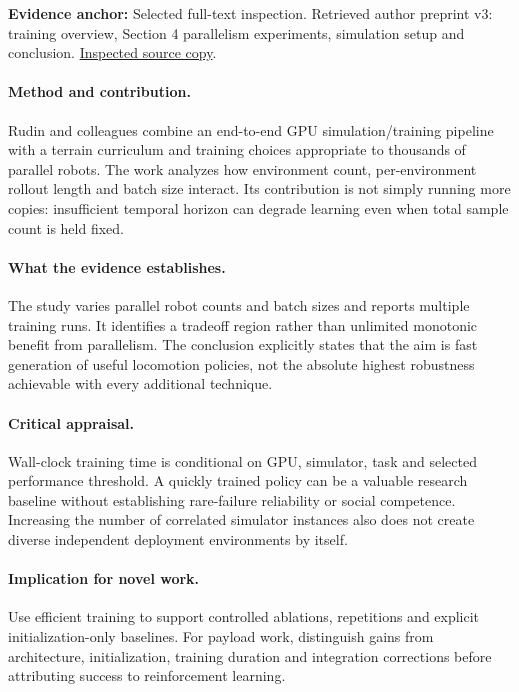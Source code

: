 \textbf{Evidence anchor:} Selected full-text inspection. Retrieved author preprint v3: training overview, Section 4 parallelism experiments, simulation setup and conclusion. \href{https://arxiv.org/pdf/2109.11978}{Inspected source copy}.

\paragraph{Method and contribution.} Rudin and colleagues combine an end-to-end GPU simulation/training pipeline with a terrain curriculum and training choices appropriate to thousands of parallel robots. The work analyzes how environment count, per-environment rollout length and batch size interact. Its contribution is not simply running more copies: insufficient temporal horizon can degrade learning even when total sample count is held fixed.

\paragraph{What the evidence establishes.} The study varies parallel robot counts and batch sizes and reports multiple training runs. It identifies a tradeoff region rather than unlimited monotonic benefit from parallelism. The conclusion explicitly states that the aim is fast generation of useful locomotion policies, not the absolute highest robustness achievable with every additional technique.

\paragraph{Critical appraisal.} Wall-clock training time is conditional on GPU, simulator, task and selected performance threshold. A quickly trained policy can be a valuable research baseline without establishing rare-failure reliability or social competence. Increasing the number of correlated simulator instances also does not create diverse independent deployment environments by itself.

\paragraph{Implication for novel work.} Use efficient training to support controlled ablations, repetitions and explicit initialization-only baselines. For payload work, distinguish gains from architecture, initialization, training duration and integration corrections before attributing success to reinforcement learning.

